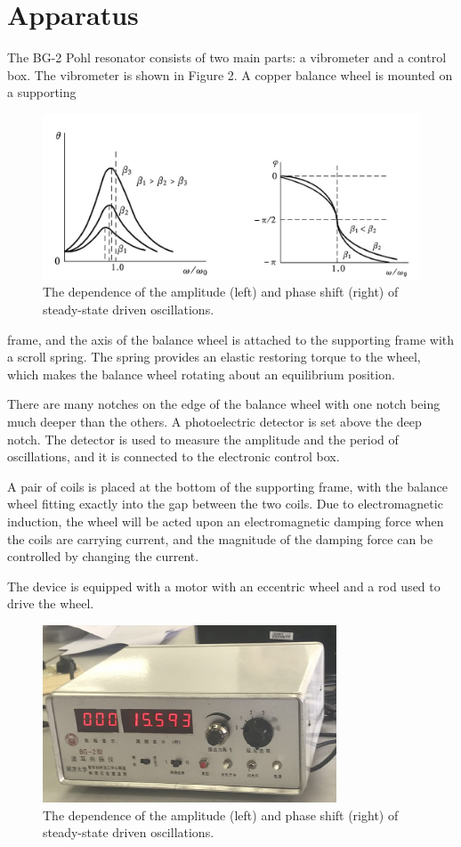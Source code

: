 \documentclass[12pt]{article}
\begin{document}
\section{Apparatus}
The BG-2 Pohl resonator consists of two main parts: a vibrometer and a control box.
The vibrometer is shown in Figure 2. A copper balance wheel is mounted on a supporting
\begin{figure}[H]
\centering
\includegraphics[scale=0.4]{P1.jpg}
\caption{The dependence of the amplitude (left) and phase shift (right) of steady-state driven oscillations.}
\end{figure}
frame, and the axis of the balance wheel is attached to the supporting frame with a scroll spring. The spring provides an elastic restoring torque to the wheel, which makes the balance wheel rotating about an equilibrium position.
\par There are many notches on the edge of the balance wheel with one notch being much
deeper than the others. A photoelectric detector is set above the deep notch. The detector is used to measure the amplitude and the period of oscillations, and it is connected to the electronic control box.
\par A pair of coils is placed at the bottom of the supporting frame, with the balance wheel fitting exactly into the gap between the two coils. Due to electromagnetic induction, the wheel will be acted upon an electromagnetic damping force when the coils are carrying current, and the magnitude of the damping force can be controlled by changing the current.
\par The device is equipped with a motor with an eccentric wheel and a rod used to drive the wheel.
\begin{figure}[H]
\centering
\includegraphics[scale=1]{P7.jpg}
\caption{The dependence of the amplitude (left) and phase shift (right) of steady-state driven oscillations.}
\end{figure}
\end{document}
